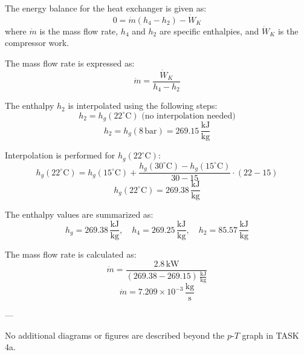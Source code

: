 The energy balance for the heat exchanger is given as:  
\[
0 = \dot{m} \left( h_4 - h_2 \right) - \dot{W}_K
\]  
where \( \dot{m} \) is the mass flow rate, \( h_4 \) and \( h_2 \) are specific enthalpies, and \( \dot{W}_K \) is the compressor work.

The mass flow rate is expressed as:  
\[
\dot{m} = \frac{\dot{W}_K}{h_4 - h_2}
\]

The enthalpy \( h_2 \) is interpolated using the following steps:  
\[
h_2 = h_g(22^\circ \text{C}) \text{ (no interpolation needed)}
\]  
\[
h_2 = h_g(8 \, \text{bar}) = 269.15 \, \frac{\text{kJ}}{\text{kg}}
\]

Interpolation is performed for \( h_g(22^\circ \text{C}) \):  
\[
h_g(22^\circ \text{C}) = h_g(15^\circ \text{C}) + \frac{h_g(30^\circ \text{C}) - h_g(15^\circ \text{C})}{30 - 15} \cdot (22 - 15)
\]  
\[
h_g(22^\circ \text{C}) = 269.38 \, \frac{\text{kJ}}{\text{kg}}
\]

The enthalpy values are summarized as:  
\[
h_g = 269.38 \, \frac{\text{kJ}}{\text{kg}}, \quad h_4 = 269.25 \, \frac{\text{kJ}}{\text{kg}}, \quad h_2 = 85.57 \, \frac{\text{kJ}}{\text{kg}}
\]

The mass flow rate is calculated as:  
\[
\dot{m} = \frac{2.8 \, \text{kW}}{(269.38 - 269.15) \, \frac{\text{kJ}}{\text{kg}}}
\]  
\[
\dot{m} = 7.209 \times 10^{-3} \, \frac{\text{kg}}{\text{s}}
\]  

---

No additional diagrams or figures are described beyond the \( p \)-\( T \) graph in TASK 4a.